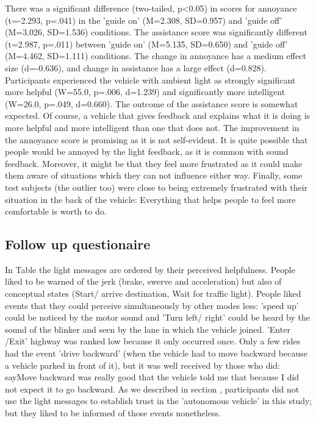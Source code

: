 There was a significant difference (two-tailed, p<0.05) in scores for annoyance (t=-2.293, p=.041) in the 'guide on' (M=2.308, SD=0.957) and 'guide off' (M=3.026, SD=1.536) conditions. 
The assistance score was significantly different (t=2.987, p=.011) between 'guide on' (M=5.135, SD=0.650) and 'guide off' (M=4.462, SD=1.111) conditions. The change in annoyance has a medium effect size (d=-0.636), and change in assistance has a large effect (d=0.828). Participants experienced the vehicle with ambient light as strongly significant more helpful (W=55.0, p=.006, d=1.239) and significantly more intelligent (W=26.0, p=.049, d=0.660). The outcome of the assistance score is somewhat expected. Of course, a vehicle that gives feedback and explains what it is doing is more helpful and more intelligent than one that does not. The improvement in the annoyance score is promising as it is not self-evident. It is quite possible that people would be annoyed by the light feedback, as it is common with sound feedback. Moreover, it might be that they feel more frustrated as it could make them aware of situations which they can not influence either way. Finally, some test subjects (the outlier too) were close to being extremely frustrated with their situation in the back of the vehicle: Everything that helps people to feel more comfortable is worth to do. 


\subsection{Follow up questionaire}
In Table  the light messages are ordered by their perceived helpfulness. People liked to be warned of the jerk (brake, swerve and acceleration) but also of conceptual states (Start/ arrive destination, Wait for traffic light). People liked events that they could perceive simultaneously by other modes less: 'speed up' could be noticed by the motor sound and 'Turn left/ right' could be heard by the sound of the blinker and seen by the lane in which the vehicle joined. 'Enter /Exit' highway was ranked low because it only occurred once. Only a few rides had the event 'drive backward' (when the vehicle had to move backward because a vehicle parked in front of it), but it was well received by those who did: say{Move backward was really good that the vehicle told me that because I did not expect it to go backward}. As we described in section , participants did not use the light messages to establish trust in the 'autonomous vehicle' in this study; but they liked to be informed of those events nonetheless. 

